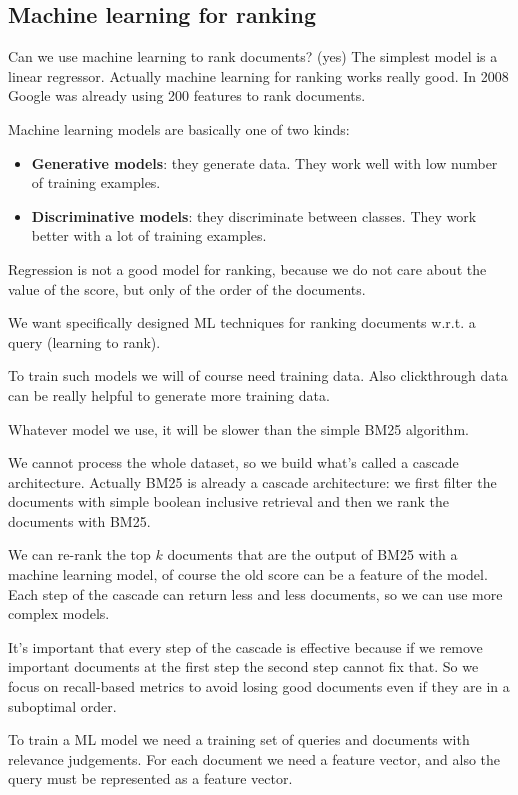 \subsection{Machine learning for ranking}
\label{sec:machine_learning_ranking}

Can we use machine learning to rank documents? (yes)
The simplest model is a linear regressor.
Actually machine learning for ranking works really good.
In 2008 Google was already using 200 features to rank documents.

Machine learning models are basically one of two kinds:
\begin{itemize}
    \item \textbf{Generative models}: they generate data.
    They work well with low number of training examples.
    \item \textbf{Discriminative models}: they discriminate between
    classes. They work better with a lot of training examples.
\end{itemize}

Regression is not a good model for ranking, because we do not
care about the value of the score, but only of the order of the
documents.

We want specifically designed ML techniques for ranking documents
w.r.t. a query (learning to rank).

To train such models we will of course need training data.
Also clickthrough data can be really helpful to generate more
training data.

Whatever model we use, it will be slower than the simple
BM25 algorithm.

We cannot process the whole dataset, so we build what's called
a cascade architecture. Actually BM25 is already a cascade
architecture: we first filter the documents with simple
boolean inclusive retrieval and then we rank the documents
with BM25.

We can re-rank the top $k$ documents that are the output of
BM25 with a machine learning model, of course the old score
can be a feature of the model.
Each step of the cascade can return less and less documents,
so we can use more complex models.

It's important that every step of the cascade is effective
because if we remove important documents at the first step
the second step cannot fix that. So we focus on recall-based
metrics to avoid losing good documents even if they are in a
suboptimal order.

To train a ML model we need a training set of queries and
documents with relevance judgements.
For each document we need a feature vector, and also
the query must be represented as a feature vector.

